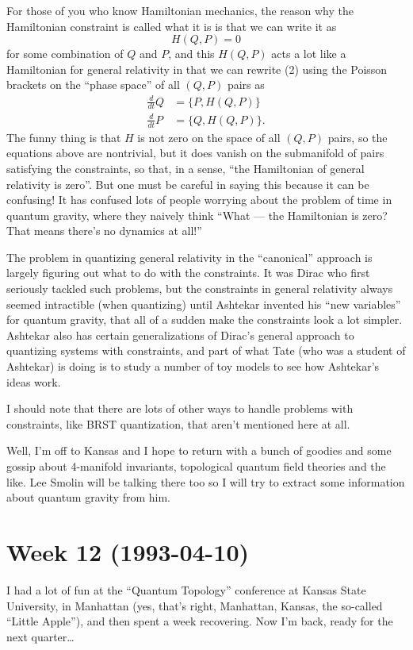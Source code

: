 \documentclass{article}
\begin{document}
For those of you who know Hamiltonian mechanics, the reason why the
Hamiltonian constraint is called what it is is that we can write it as
\[H(Q,P) = 0\] for some combination of \(Q\) and \(P\), and this
\(H(Q,P)\) acts a lot like a Hamiltonian for general relativity in that
we can rewrite (2) using the Poisson brackets on the ``phase space'' of
all \((Q,P)\) pairs as
\[\begin{aligned}\frac{d}{dt}Q &= \{P,H(Q,P)\} \\ \frac{d}{dt}P &= \{Q,H(Q,P)\}.\end{aligned}\]
The funny thing is that \(H\) is not zero on the space of all \((Q,P)\)
pairs, so the equations above are nontrivial, but it does vanish on the
submanifold of pairs satisfying the constraints, so that, in a sense,
``the Hamiltonian of general relativity is zero''. But one must be
careful in saying this because it can be confusing! It has confused lots
of people worrying about the problem of time in quantum gravity, where
they naively think ``What --- the Hamiltonian is zero? That means
there's no dynamics at all!''

The problem in quantizing general relativity in the ``canonical''
approach is largely figuring out what to do with the constraints. It was
Dirac who first seriously tackled such problems, but the constraints in
general relativity always seemed intractible (when quantizing) until
Ashtekar invented his ``new variables'' for quantum gravity, that all of
a sudden make the constraints look a lot simpler. Ashtekar also has
certain generalizations of Dirac's general approach to quantizing
systems with constraints, and part of what Tate (who was a student of
Ashtekar) is doing is to study a number of toy models to see how
Ashtekar's ideas work.

I should note that there are lots of other ways to handle problems with
constraints, like BRST quantization, that aren't mentioned here at all.

Well, I'm off to Kansas and I hope to return with a bunch of goodies and
some gossip about 4-manifold invariants, topological quantum field
theories and the like. Lee Smolin will be talking there too so I will
try to extract some information about quantum gravity from him.
\hypertarget{week12}{%
\section{Week 12 (1993-04-10)}\label{week12}}

I had a lot of fun at the ``Quantum Topology'' conference at Kansas
State University, in Manhattan (yes, that's right, Manhattan, Kansas,
the so-called ``Little Apple''), and then spent a week recovering. Now
I'm back, ready for the next quarter\ldots{}
\end{document}
